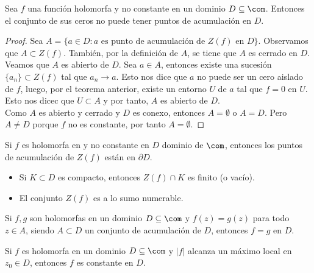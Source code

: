 \begin{teo}
Sea $f$ una función holomorfa y no constante en un dominio $D \subseteq \com$. Entonces el conjunto de sus ceros no puede tener puntos de acumulación en $D$.
\end{teo}

\begin{proof}
Sea $A = \{ a \in D : a \text{ es punto de acumulación de } Z(f) \text{ en } D \}$. Observamos que $A \subset Z(f)$. También, por la definición de $A$, se tiene que $A$ es cerrado en $D$.
\\
\newline
Veamos que $A$ es abierto de $D$. Sea $a \in A$, entonces existe una sucesión $\{a_n\} \subset Z(f)$ tal que $a_n \to a$. Esto nos dice que $a$ no puede ser un cero aislado de $f$, luego, por el teorema anterior, existe un entorno $U$ de $a$ tal que $f = 0$ en $U$. Esto nos dicec que $U \subset A$ y por tanto, $A$ es abierto de $D$.
\\
\newline
Como $A$ es abierto y cerrado y $D$ es conexo, entonces $A = \emptyset$ o $A = D$. Pero $A \not = D$ porque $f$ no es constante, por tanto $A = \emptyset$.
\end{proof}

\begin{cor}
Si $f$ es holomorfa en y no constante en $D$ dominio de $\com$, entonces los puntos de acumulación de $Z(f)$ están en $\partial D$.
\end{cor}

\begin{obs}
\begin{itemize}
    \item  Si $K \subset D$ es compacto, entonces $Z(f) \cap K$ es finito (o vacío). 
    \item El conjunto $Z(f)$ es a lo sumo numerable.
\end{itemize}
\end{obs}

\begin{cor}
Si $f,g$ son holomorfas en un dominio $D \subseteq \com$ y $f(z) = g(z)$ para todo $z \in A$, siendo $A \subset D$ un conjunto de acumulación de $D$, entonces $f = g$ en $D$.
\end{cor}

\begin{teo}
Si $f$ es holomorfa en un dominio $D \subseteq \com$ y $|f|$ alcanza un máximo local en $z_0 \in D$, entonces $f$ es constante en $D$.
\end{teo}

